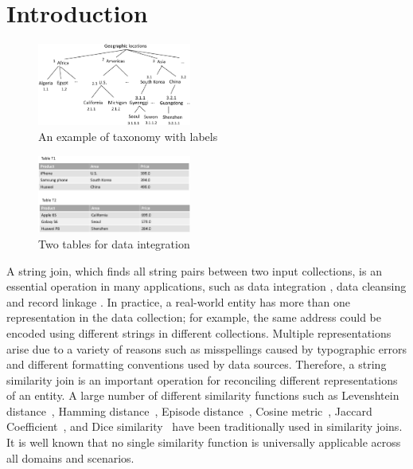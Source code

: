 \section{Introduction}

\begin{figure}[t]
\centering
\includegraphics[width=0.45\textwidth]{figures/taxonomylabels}
 \caption{An example of taxonomy with labels}
\label{fig:taxonomyexample}
\end{figure}


\begin{figure}[t]
\centering
\includegraphics[width=0.45\textwidth]{figures/productexample}
 \caption{Two tables for data integration}
\label{fig:twotables}
\end{figure}


A string join, which finds all string pairs between two input collections, is an essential operation in many applications, such as  data integration \cite{conf/sigmod/Sarawagi04}, data cleansing \cite{conf/vldb/ArasuGK06,journals/www/LiJM06} and record linkage \cite{books/Winkler99}. In practice, a real-world entity has more than one representation in the data
collection; for example, the same address could be encoded using
different strings in different collections. Multiple representations
arise due to a variety of reasons such as misspellings
caused by typographic errors and different formatting conventions
used by data sources. Therefore, a string similarity join is an important operation for reconciling different
representations of an entity. A large number of different similarity functions such as Levenshtein distance~\cite{conf/sigmod/WangLF12},
Hamming distance~\cite{conf/spire/Kondrak05}, Episode
distance~\cite{conf/ijcai/CohenRF03}, Cosine
metric~\cite{journals/ipm/SaltonB88}, Jaccard
Coefficient~\cite{conf/icde/ChaudhuriGK06,conf/icde/LiLL08}, and Dice
similarity~\cite{conf/www/BayardoMS07} have been traditionally used in similarity joins. It is well known
that no single similarity function is universally applicable
across all domains and scenarios.


